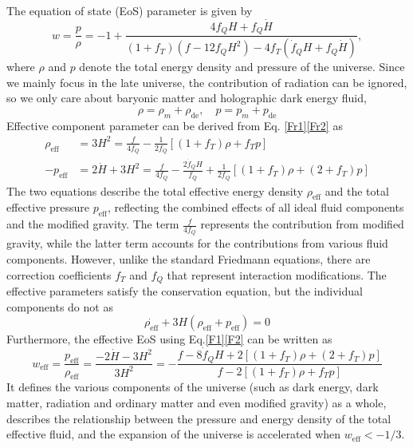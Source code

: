 \documentclass[a4paper,fleqn]{cas-sc}
\begin{document}
The equation of state (EoS) parameter is given by
\begin{equation}
    w=\frac{p}{\rho}=-1+\frac{4 f_Q H+f_Q \dot{H}}{(1+f_T)(f-12f_QH^2)-4 f_T(\dot{f}_QH+f_Q \dot{H})},
\end{equation}
where $\rho$ and $p$ denote the total energy density and pressure of the universe. Since we mainly focus in the late universe, the contribution of radiation can be ignored, so we only care about baryonic matter and holographic dark energy fluid,
\begin{equation}
    \rho=\rho_m+\rho_\text{de}, \quad p=p_m+p_\text{de}
\end{equation}
Effective component parameter can be derived from Eq. \eqref{Fr1}\eqref{Fr2} as
\begin{align}
    \rho_{\text{eff}}&=3H^2=\frac{f}{4f_Q}-\frac{1}{2f_Q}[(1+f_T)\rho+f_T p] \label{F1}\\
    -p_{\text{eff}}&=2\dot{H}+3H^2=\frac{f}{4f_Q}-\frac{2\dot{f}_Q H}{f_Q}+\frac{1}{2f_Q}[(1+f_T)\rho +(2+f_T)p] \label{F2}
\end{align}
The two equations describe the total effective energy density \(\rho_{\text{eff}}\) and the total effective pressure \(p_{\text{eff}}\), reflecting the combined effects of all ideal fluid components and the modified gravity. The term \(\frac{f}{4f_Q}\) represents the contribution from modified gravity, while the latter term accounts for the contributions from various fluid components. However, unlike the standard Friedmann equations, there are correction coefficients \(f_T\) and \(f_Q\) that represent interaction modifications. The effective parameters satisfy the conservation equation, but the individual components do not as
\begin{equation}
    \dot{\rho_{\text{eff}}}+3H(\rho_{\text{eff}}+p_\text{eff})=0
\end{equation}
Furthermore, the effective EoS using Eq.\eqref{F1}\eqref{F2} can be written as
\begin{equation}
    w_{\text{eff}}=\frac{p_{\text{eff}}}{\rho_{\text{eff}}} = \frac{-2\dot{H}-3H^2}{3H^2}= -\frac{f - 8\dot{f}_Q H + 2[(1 + f_T)\rho + (2 + f_T)p]}{f - 2[(1 + f_T)\rho + f_T p]}
\end{equation}
It defines the various components of the universe (such as dark energy, dark matter, radiation and ordinary matter and even modified gravity) as a whole, describes the relationship between the pressure and energy density of the total effective fluid, and the expansion of the universe is accelerated when $w_\text{eff}<-1/3$.
\end{document}
